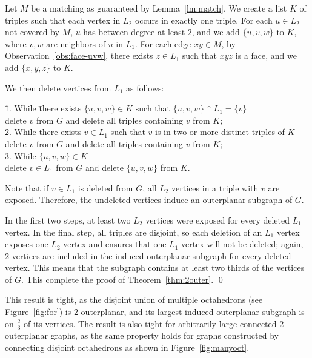 \documentclass[11pt]{article}
\begin{document}
Let $M$ be a matching as guaranteed by Lemma~\ref{lm:match}. We create a list $K$ of triples such that each vertex in $L_2$ occurs in exactly one triple. For each $u\in L_2$ not covered by $M$, $u$ has between degree at least $2$, and we add $\{u, v, w\}$ to $K$, where $v, w$ are neighbors of $u$ in $L_1$. For each edge $xy\in M$, by Observation~\ref{obs:face-uvw}, there exists $z\in L_1$ such that $xyz$ is a face, and we add $\{x, y, z\}$ to $K$.

We then delete vertices from $L_1$ as follows:
\begin{tabbing} 
\hspace{16pt} \= 1. While \= there exists $\{u, v, w\}\in K$ such that $\{u, v, w\}\cap L_1=\{v\}$ \+\+\\

delete $v$ from $G$ and delete all triples containing $v$ from $K$;\-\\
 
2. While there exists $v\in L_1$ such that $v$ is in two or more distinct triples of $K$\+ \\

delete $v$ from $G$ and delete all triples containing $v$ from $K$;\-\\

3. While $\{u, v, w\} \in K$\+\\

delete $v \in L_1$ from $G$ and delete $\{u, v, w\}$ from $K$.\\
\end{tabbing}

Note that if $v\in L_1$ is deleted from $G$, all $L_2$ vertices in a triple with $v$ are exposed. Therefore, the undeleted vertices induce an outerplanar subgraph of $G$.

In the first two steps, at least two $L_2$ vertices were exposed for every deleted $L_1$ vertex. In the final step, all triples are disjoint, so each deletion of an $L_1$ vertex exposes one $L_2$ vertex and ensures that one $L_1$ vertex will not be deleted; again, 2 vertices are included in the induced outerplanar subgraph for every deleted vertex. This means that the subgraph contains at least two thirds of the vertices of $G$. This complete the proof of Theorem~\ref{thm:2outer}. \qed

\bigskip
This result is tight, as the disjoint union of multiple octahedrons (see Figure~\ref{fig:for}) is 2-outerplanar, and its largest induced outerplanar subgraph is on $\frac{2}{3}$ of its vertices. The result is also tight for arbitrarily large  connected 2-outerplanar graphs, as the same property holds for graphs constructed by connecting disjoint octahedrons as shown in Figure~\ref{fig:manyoct}.
\end{document}
